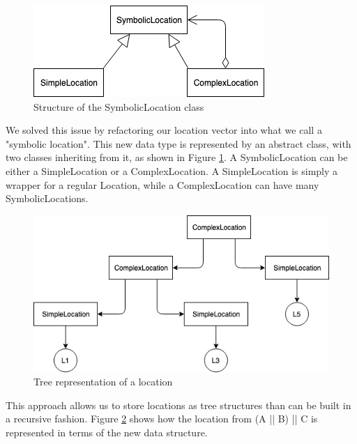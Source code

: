 \begin{figure}
  \centering
  \includegraphics[scale=0.7]{figures/nestedness.png}
  \caption{Structure of the SymbolicLocation class}
  \label{fig:nestedness}
\end{figure}

We solved this issue by refactoring our location vector into what we call a "symbolic location". This new data type is represented by an abstract class, with two classes inheriting from it, as shown in Figure \ref{fig:nestedness}. A SymbolicLocation can be either a SimpleLocation or a ComplexLocation. A SimpleLocation is simply a wrapper for a regular Location, while a ComplexLocation can have many SymbolicLocations.

\begin{figure}
  \centering
  \includegraphics[scale=0.7]{figures/symbolicLoc.png}
  \caption{Tree representation of a location}
  \label{fig:symbolicLoc}
\end{figure}

This approach allows us to store locations as tree structures than can be built in a recursive fashion. Figure \ref{fig:symbolicLoc} shows how the location from (A || B) || C is represented in terms of the new data structure.

